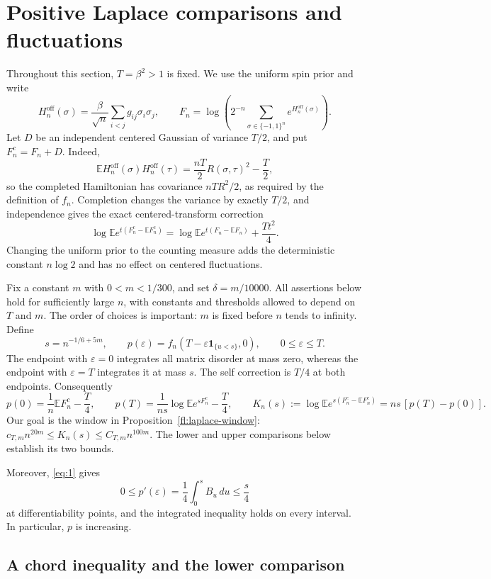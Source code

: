 \section{Positive Laplace comparisons and fluctuations}\label{sec:fluctuations}

Throughout this section, $T=\beta^2>1$ is fixed.  We use the uniform
spin prior and write
\[
 H_n^{\mathrm{off}}(\sigma)
   =\frac{\beta}{\sqrt n}\sum_{i<j}g_{ij}\sigma_i\sigma_j,
 \qquad
 F_n=\log\left(2^{-n}\sum_{\sigma\in\{-1,1\}^n}
                         e^{H_n^{\mathrm{off}}(\sigma)}\right).
\]
Let $D$ be an independent centered Gaussian of variance $T/2$, and put
$F_n^c=F_n+D$.  Indeed,
\[
 \mathbb E H_n^{\mathrm{off}}(\sigma)H_n^{\mathrm{off}}(\tau)
       =\frac{nT}{2}R(\sigma,\tau)^2-\frac T2,
\]
so the completed Hamiltonian has covariance $nTR^2/2$, as required by
the definition of $f_n$.  Completion changes the variance by exactly
$T/2$, and independence gives the exact centered-transform correction
\[
 \log\mathbb E e^{t(F_n^c-\mathbb EF_n^c)}
 =\log\mathbb E e^{t(F_n-\mathbb EF_n)}+\frac{Tt^2}{4}.
\]
Changing the uniform prior to the counting measure adds the
deterministic constant $n\log2$ and has no effect on centered fluctuations.

Fix a constant $m$ with $0<m<1/300$, and set $\delta=m/10000$.
All assertions below hold for sufficiently large $n$, with constants
and thresholds allowed to depend on $T$ and $m$.  The order of choices
is important: $m$ is fixed before $n$ tends to infinity.  Define
\[
 s=n^{-1/6+5m},\qquad
 p(\varepsilon)=f_n(T-\varepsilon\mathbf1_{\{u<s\}},0),
 \qquad 0\le\varepsilon\le T.
\]
The endpoint with $\varepsilon=0$ integrates all matrix disorder at
mass zero, whereas the endpoint with $\varepsilon=T$ integrates it at
mass $s$.  The self correction is $T/4$ at both endpoints.  Consequently
\[
 p(0)=\frac1n\mathbb EF_n^c-\frac T4,\qquad
 p(T)=\frac1{ns}\log\mathbb E e^{sF_n^c}-\frac T4,
 \qquad
 K_n(s):=\log\mathbb E e^{s(F_n^c-\mathbb EF_n^c)}
               =ns\,[p(T)-p(0)].
\]
Our goal is the window in Proposition~\ref{fl:laplace-window}:
$c_{T,m}n^{20m}\le K_n(s)\le C_{T,m}n^{100m}$.
The lower and upper comparisons below establish its two bounds.

Moreover, \eqref{eq:1} gives
\[
 0\le p'(\varepsilon)=\frac14\int_0^s B_u\,du\le\frac s4
\]
at differentiability points, and the integrated inequality holds on
every interval.  In particular, $p$ is increasing.

\subsection{A chord inequality and the lower comparison}

